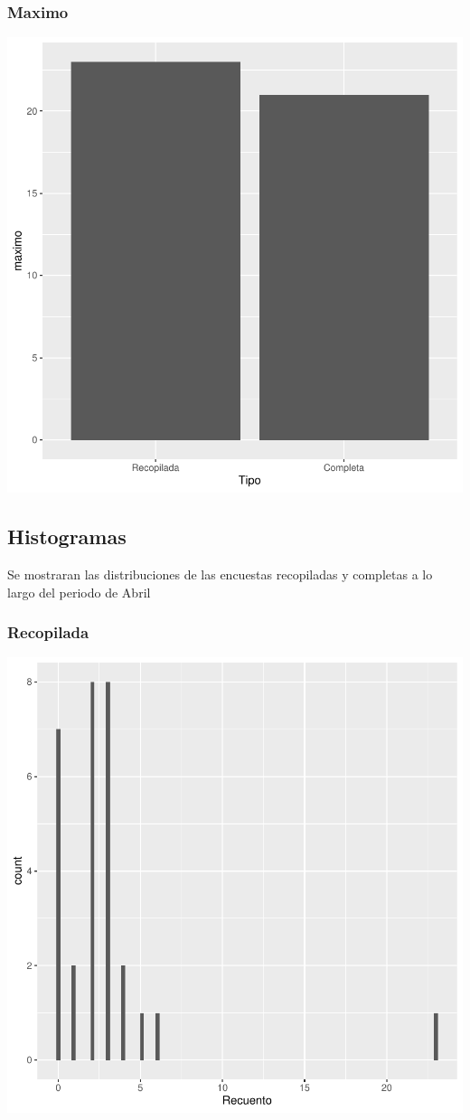 \documentclass{article}
\begin{document}
\subsubsection{Maximo}

\includegraphics{seguimento2-070}

\subsection{Histogramas}
Se mostraran las distribuciones de las encuestas recopiladas y completas a lo largo del periodo de Abril

\subsubsection{Recopilada}

\includegraphics{seguimento2-071}
\end{document}
